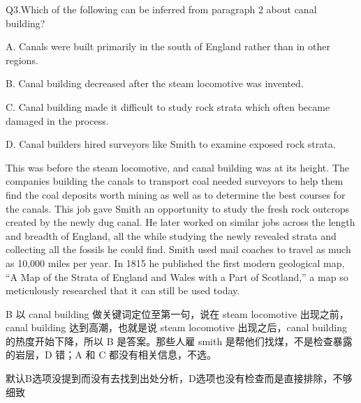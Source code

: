 \begin{blk}
    \begin{qst}
        Q3.Which of the following can be inferred from paragraph 2 about canal building?
    \end{qst}

    \begin{chc}
        A. Canals were built primarily in the south of England rather than in other regions.

        B. Canal building decreased after the steam locomotive was invented.

        C. Canal building made it difficult to study rock strata which often became damaged in the process.

        D. Canal builders hired surveyors like Smith to examine exposed rock strata.
    \end{chc}

    \begin{psgq}
        This was before the steam locomotive, and canal building was at its height. The companies building the canals to transport coal needed surveyors to help them find the coal deposits worth mining as well as to determine the best courses for the canals. This job gave Smith an opportunity to study the fresh rock outcrops created by the newly dug canal. He later worked on similar jobs across the length and breadth of England, all the while studying the newly revealed strata and collecting all the fossils he could find. Smith used mail coaches to travel as much as 10,000 miles per year. In 1815 he published the first modern geological map, “A Map of the Strata of England and Wales with a Part of Scotland,” a map so meticulously researched that it can still be used today.
    \end{psgq}

    \begin{nlz}
        B 以 canal building 做关键词定位至第一句，说在 steam locomotive 出现之前，canal building 达到高潮，也就是说 steam locomotive 出现之后，canal building 的热度开始下降，所以 B 是答案。那些人雇 smith 是帮他们找煤，不是检查暴露的岩层，D 错；A 和 C 都没有相关信息，不选。

        默认B选项没提到而没有去找到出处分析，D选项也没有检查而是直接排除，不够细致
    \end{nlz}
\end{blk}

